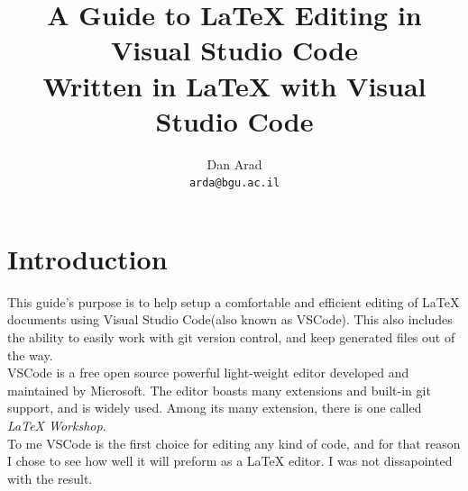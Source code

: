 \documentclass{article}
\newcommand{\latex}{\LaTeX\xspace}
\newcommand{\email}[1]{\texttt{#1}}
\begin{document}
\title{
	A Guide to \latex Editing in Visual Studio Code\\
	\large Written in \latex with Visual Studio Code
}
\author{
	Dan Arad\\
	\email{arda@bgu.ac.il}
}
\maketitle

\section{Introduction}
This guide's purpose is to help setup a comfortable and efficient editing of \latex documents using Visual Studio Code\footnotemark[1] (also known as VSCode). This also includes the ability to easily work with git version control, and keep generated files out of the way.\\
VSCode is a free open source powerful light-weight editor developed and maintained by Microsoft. The editor boasts many extensions and built-in git support, and is widely used. Among its many extension, there is one called \emph{\latex Workshop}\footnotemark[2].\\
To me VSCode is the first choice for editing any kind of code, and for that reason I chose to see how well it will preform as a \latex editor. I was not dissapointed with the result.

\end{document}
